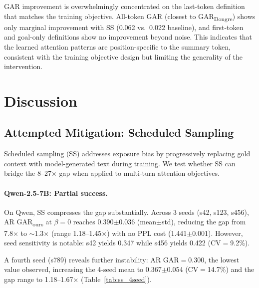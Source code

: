 \documentclass[11pt]{article}
\newcommand{\gar}{\textsc{GAR}}
\newcommand{\garours}{\textsc{GAR}\textsubscript{ours}}
\newcommand{\gardongre}{\textsc{GAR}\textsubscript{Dongre}}
\renewcommand{\ss}{\textsc{SS}}
\begin{document}
\gar{} improvement is overwhelmingly concentrated on the last-token definition that matches the training objective. All-token \gar{} (closest to \gardongre{}) shows only marginal improvement with \ss{} (0.062 vs.\ 0.022 baseline), and first-token and goal-only definitions show no improvement beyond noise. This indicates that the learned attention patterns are position-specific to the summary token, consistent with the training objective design but limiting the generality of the intervention.

\section{Discussion}

\subsection{Attempted Mitigation: Scheduled Sampling}
\label{sec:ss}

Scheduled sampling (SS) \citep{bengio2015scheduled} addresses exposure bias by progressively replacing gold context with model-generated text during training. We test whether SS can bridge the 8--27$\times$ gap when applied to multi-turn attention objectives.

\paragraph{Qwen-2.5-7B: Partial success.}
On Qwen, SS compresses the gap substantially. Across 3 seeds (s42, s123, s456), AR \garours{} at $\beta=0$ reaches 0.390$\pm$0.036 (mean$\pm$std), reducing the gap from 7.8$\times$ to $\sim$1.3$\times$ (range 1.18--1.45$\times$) with no PPL cost (1.441$\pm$0.001). However, seed sensitivity is notable: s42 yields 0.347 while s456 yields 0.422 (CV$=$9.2\%).

A fourth seed (s789) reveals further instability: AR \gar{}$=$0.300, the lowest value observed, increasing the 4-seed mean to 0.367$\pm$0.054 (CV$=$14.7\%) and the gap range to 1.18--1.67$\times$ (Table~\ref{tab:ss_4seed}).
\end{document}
